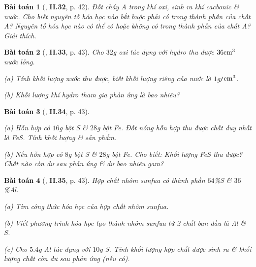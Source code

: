\documentclass{article}
\numberwithin{equation}{section}
\newtheorem{baitoan}{Bài toán}
\begin{document}
\begin{baitoan}[\cite{Truong_BTNC_Hoa_Hoc_8_2022}, \textbf{II.32}, p. 42]
	Đốt cháy A trong khí oxi, sinh ra khí cacbonic \& nước. Cho biết nguyên tố hóa học nào bắt buộc phải có trong thành phần của chất A? Nguyên tố hóa học nào có thể có hoặc không có trong thành phần của chất A? Giải thích.
\end{baitoan}

\begin{baitoan}[\cite{Truong_BTNC_Hoa_Hoc_8_2022}, \textbf{II.33}, p. 43]
	Cho $32$\emph{g} oxi tác dụng với hydro thu được $\rm36cm^3$ nước lỏng. 
	\begin{enumerate*}
		\item[(a)] Tính khối lượng nước thu được, biết khối lượng riêng của nước là $1$\emph{g\texttt{/}$\rm cm^3$}.
		\item[(b)] Khối lượng khí hydro tham gia phản ứng là bao nhiêu?
	\end{enumerate*}
\end{baitoan}

\begin{baitoan}[\cite{Truong_BTNC_Hoa_Hoc_8_2022}, \textbf{II.34}, p. 43]
	\begin{enumerate*}
		\item[(a)] Hỗn hợp có $16$\emph{g} bột \emph{S} \& $28$\emph{g} bột \emph{Fe}. Đốt nóng hỗn hợp thu được chất duy nhất là \emph{FeS}. Tính khối lượng \& sản phẩm.
		\item[(b)] Nếu hỗn hợp có $8$\emph{g} bột \emph{S} \& $28$\emph{g} bột \emph{Fe}. Cho biết: Khối lượng \emph{FeS} thu được? Chất nào còn dư sau phản ứng \& dư bao nhiêu gam?
	\end{enumerate*}
\end{baitoan}

\begin{baitoan}[\cite{Truong_BTNC_Hoa_Hoc_8_2022}, \textbf{II.35}, p. 43]
	Hợp chất nhôm sunfua có thành phần $64$\%\emph{S} \& $36$\%\emph{Al}.
	\begin{enumerate*}
		\item[(a)] Tìm công thức hóa học của hợp chất nhôm sunfua.
		\item[(b)] Viết phương trình hóa học tạo thành nhôm sunfua từ 2 chất ban đầu là \emph{Al} \& \emph{S}.
		\item[(c)] Cho $5.4$\emph{g Al} tác dụng với $10$\emph{g S}. Tính khối lượng hợp chất được sinh ra \& khối lượng chất còn dư sau phản ứng (nếu có).
	\end{enumerate*}
\end{baitoan}
\end{document}

